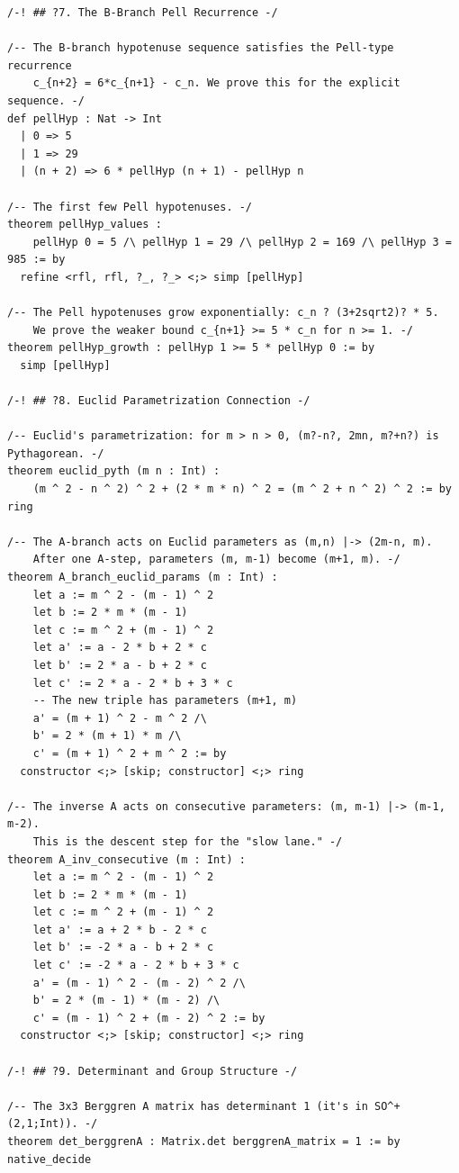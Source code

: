 \documentclass[11pt,twoside,openright]{book}
\theoremstyle{definition}
\theoremstyle{remark}
\begin{document}
\begin{lstlisting}[style=lean]
/-! ## ?7. The B-Branch Pell Recurrence -/

/-- The B-branch hypotenuse sequence satisfies the Pell-type recurrence
    c_{n+2} = 6*c_{n+1} - c_n. We prove this for the explicit sequence. -/
def pellHyp : Nat -> Int
  | 0 => 5
  | 1 => 29
  | (n + 2) => 6 * pellHyp (n + 1) - pellHyp n

/-- The first few Pell hypotenuses. -/
theorem pellHyp_values :
    pellHyp 0 = 5 /\ pellHyp 1 = 29 /\ pellHyp 2 = 169 /\ pellHyp 3 = 985 := by
  refine <rfl, rfl, ?_, ?_> <;> simp [pellHyp]

/-- The Pell hypotenuses grow exponentially: c_n ? (3+2sqrt2)? * 5.
    We prove the weaker bound c_{n+1} >= 5 * c_n for n >= 1. -/
theorem pellHyp_growth : pellHyp 1 >= 5 * pellHyp 0 := by
  simp [pellHyp]

/-! ## ?8. Euclid Parametrization Connection -/

/-- Euclid's parametrization: for m > n > 0, (m?-n?, 2mn, m?+n?) is Pythagorean. -/
theorem euclid_pyth (m n : Int) :
    (m ^ 2 - n ^ 2) ^ 2 + (2 * m * n) ^ 2 = (m ^ 2 + n ^ 2) ^ 2 := by ring

/-- The A-branch acts on Euclid parameters as (m,n) |-> (2m-n, m).
    After one A-step, parameters (m, m-1) become (m+1, m). -/
theorem A_branch_euclid_params (m : Int) :
    let a := m ^ 2 - (m - 1) ^ 2
    let b := 2 * m * (m - 1)
    let c := m ^ 2 + (m - 1) ^ 2
    let a' := a - 2 * b + 2 * c
    let b' := 2 * a - b + 2 * c
    let c' := 2 * a - 2 * b + 3 * c
    -- The new triple has parameters (m+1, m)
    a' = (m + 1) ^ 2 - m ^ 2 /\
    b' = 2 * (m + 1) * m /\
    c' = (m + 1) ^ 2 + m ^ 2 := by
  constructor <;> [skip; constructor] <;> ring

/-- The inverse A acts on consecutive parameters: (m, m-1) |-> (m-1, m-2).
    This is the descent step for the "slow lane." -/
theorem A_inv_consecutive (m : Int) :
    let a := m ^ 2 - (m - 1) ^ 2
    let b := 2 * m * (m - 1)
    let c := m ^ 2 + (m - 1) ^ 2
    let a' := a + 2 * b - 2 * c
    let b' := -2 * a - b + 2 * c
    let c' := -2 * a - 2 * b + 3 * c
    a' = (m - 1) ^ 2 - (m - 2) ^ 2 /\
    b' = 2 * (m - 1) * (m - 2) /\
    c' = (m - 1) ^ 2 + (m - 2) ^ 2 := by
  constructor <;> [skip; constructor] <;> ring

/-! ## ?9. Determinant and Group Structure -/

/-- The 3x3 Berggren A matrix has determinant 1 (it's in SO^+(2,1;Int)). -/
theorem det_berggrenA : Matrix.det berggrenA_matrix = 1 := by native_decide


\end{lstlisting}
\end{document}
